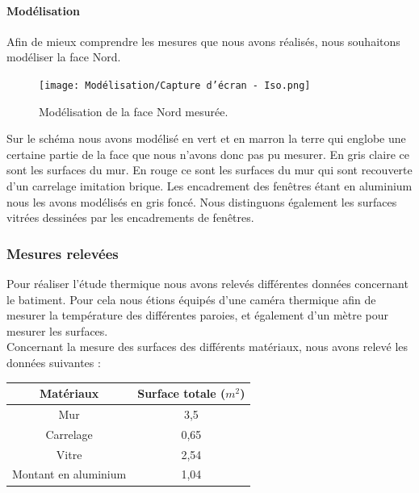 \documentclass[12pt, a4paper]{article}
\begin{document}
\paragraph{Modélisation\\}
Afin de mieux comprendre les mesures que nous avons réalisés, nous souhaitons modéliser la face Nord. 

\begin{figure}[htb!]
 \centering
 \texttt{[image: Modélisation/Capture d'écran - Iso.png]}
 \caption{Modélisation de la face Nord mesurée.}
 \label{Capture d'écran - Iso}
\end{figure}

Sur le schéma nous avons modélisé en vert et en marron la terre qui englobe une certaine partie de la face que nous n'avons donc pas pu mesurer. En gris claire ce sont les surfaces du mur. En rouge ce sont les surfaces du mur qui sont recouverte d'un carrelage imitation brique. Les encadrement des fenêtres étant en aluminium nous les avons modélisés en gris foncé. Nous distinguons également les surfaces vitrées dessinées par les encadrements de fenêtres. 


\subsubsection{Mesures relevées}


Pour réaliser l'étude thermique nous avons relevés différentes données concernant le batiment. Pour cela nous étions équipés d'une caméra thermique afin de mesurer la température des différentes paroies, et également d'un mètre pour mesurer les surfaces. \\


Concernant la mesure des surfaces des différents matériaux, nous avons relevé les données suivantes : 

\begin{table}[!ht]
    \centering
    \begin{tabular}{|c|c|}
    \hline
        Matériaux & Surface totale ($m^{2}$) \\ \hline \hline
        Mur & 3,5 \\ \hline
        Carrelage & 0,65 \\ \hline
        Vitre & 2,54 \\ \hline
        Montant en aluminium & 1,04 \\ \hline
    \end{tabular}
\end{table}
\end{document}
